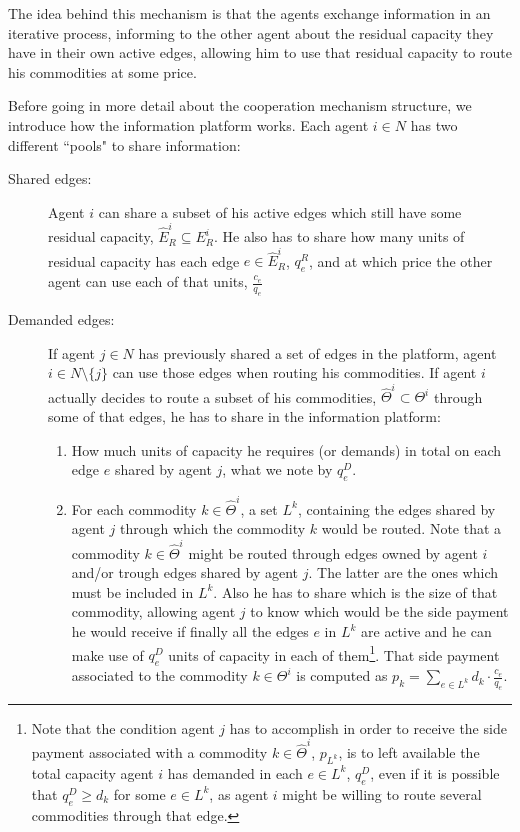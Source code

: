 \documentclass{article}
\begin{document}
The idea behind this mechanism is that the agents exchange information in an iterative process, informing to the other agent about the residual capacity they have in their own active edges, allowing him to use that residual capacity to route his commodities at some price.

Before going in more detail about the cooperation mechanism structure, we introduce how the information platform works. Each agent $i\in N$ has two different ``pools" to share information:

\begin{description}
	\item[Shared edges:] Agent $i$ can share a subset of his active edges which still have some residual capacity, $\widehat{E}_R^i\subseteq E_R^i$. He also has to share how many units of residual capacity has each edge $e\in \widehat{E}_R^i$, $q_e^R$, and at which price the other agent can use each of that units, $\frac{c_e}{q_e}$
	\item[Demanded edges:] If agent $j\in N$ has previously shared a set of edges in the platform, agent $i\in N\setminus\{j\}$ can use those edges when routing his commodities. If agent $i$ actually decides to route a subset of his commodities, $\widehat{\Theta}^i\subset \Theta ^i$ through some of that edges, he has to share in the information platform:
	\begin{enumerate}
		\item How much units of capacity he requires (or demands) in total on each edge $e$ shared by agent $j$, what we note by $q_e^D$.
	\item For each commodity $k\in \widehat{\Theta}^i$, a set $L^k$, containing the edges shared by agent $j$ through which the commodity $k$ would be routed. Note that a commodity $k\in \widehat{\Theta}^i$ might be routed through edges owned by agent $i$ and/or trough edges shared by agent $j$. The latter are the ones which must be included in $L^k$. Also he has to share which is the size of that commodity, allowing agent $j$ to know which would be the side payment he would receive if finally all the edges $e$ in $L^k$ are active and he can make use of $q_e^D$ units of capacity in each of them\footnote{\label{ft:sidepaymentexplanation}
Note that the condition agent $j$ has to accomplish in order to receive the side payment associated with a commodity $k\in\widehat{\Theta}^i$, $p_{L^k}$, is to left available the total capacity agent $i$ has demanded in each $e\in L^k$, $q_e^D$, even if it is possible that $q_e^D\geq d_k$ for some $e\in L ^k$, as agent $i$ might be willing to route several commodities through that edge.}.
That side payment associated to the commodity $k\in \Theta^i$ is computed as $p_k=\sum_{e \in L^k} d_k\cdot \frac{c_e}{q_e}$. 
	\end{enumerate}
		
\end{description}	
\end{document}
